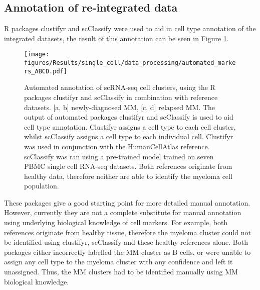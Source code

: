 \subsection{Annotation of re-integrated data}\label{subsec:sc_annotate}
R packages clustifyr and scClassify were used to aid in cell type annotation of the integrated datasets, the result of this annotation can be seen in Figure \ref{fig:annotation_automated}.
\begin{figure}[htb]
    \centering
    \texttt{[image: figures/Results/single\_cell/data\_processing/automated\_markers\_ABCD.pdf]}
    \caption[Automated annotation of scRNA-seq data]{Automated annotation of scRNA-seq cell clusters, using the R packages clustifyr and scClassify in combination with reference datasets.
    [a, b] newly-diagnosed MM, [c, d] relapsed MM.
    The output of automated packages clustifyr and scClassify is used to aid cell type annotation.
    Clustifyr assigns a cell type to each cell cluster, whilst scClassify assigns a cell type to each individual cell.
    Clustifyr was used in conjunction with the HumanCellAtlas reference.
    scClassify was ran using a pre-trained model trained on seven PBMC single cell RNA-seq datasets.
    Both references originate from healthy data, therefore neither are able to identify the myeloma cell population.}
    \label{fig:annotation_automated}
\end{figure}

These packages give a good starting point for more detailed manual annotation.
However, currently they are not a complete substitute for manual annotation using underlying biological knowledge of cell markers.
For example, both references originate from healthy tissue, therefore the myeloma cluster could not be identified using clustifyr, scClassify and these healthy references alone.
Both packages either incorrectly labelled the MM cluster as B cells, or were unable to assign any cell type to the myeloma cluster with any confidence and left it unassigned.
Thus, the MM clusters had to be identified manually using MM biological knowledge.

